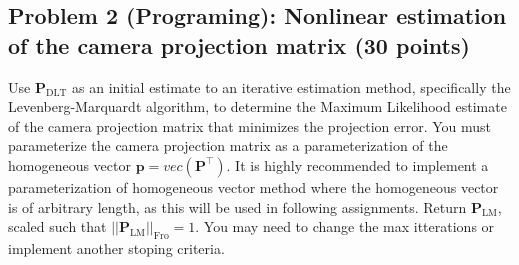 \documentclass[11pt]{article}
\begin{document}
    \hypertarget{problem-2-programing-nonlinear-estimation-of-the-camera-projection-matrix-30-points}{%
\subsection{Problem 2 (Programing): Nonlinear estimation of the camera
projection matrix (30
points)}\label{problem-2-programing-nonlinear-estimation-of-the-camera-projection-matrix-30-points}}

Use \(\boldsymbol{P}_\text{DLT}\) as an initial estimate to an iterative
estimation method, specifically the Levenberg-Marquardt algorithm, to
determine the Maximum Likelihood estimate of the camera projection
matrix that minimizes the projection error. You must parameterize the
camera projection matrix as a parameterization of the homogeneous vector
\(\boldsymbol{p} = vec{(\boldsymbol{P}^\top)}\). It is highly
recommended to implement a parameterization of homogeneous vector method
where the homogeneous vector is of arbitrary length, as this will be
used in following assignments. Return \(\boldsymbol{P}_\text{LM}\),
scaled such that \(||\boldsymbol{P}_\text{LM}||_\text{Fro} = 1\). You
may need to change the max itterations or implement another stoping
criteria.
\end{document}
